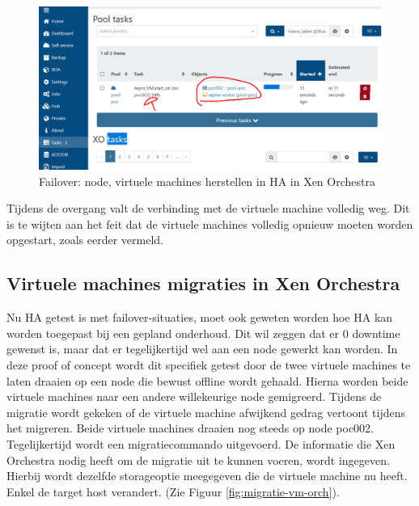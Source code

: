 \begin{figure}[H]
  \centering
  \includegraphics[width=1.1\textwidth, trim=0cm 0cm 5cm 0cm, clip]{../poc/failure-orch.png}
  \caption{Failover: node, virtuele machines herstellen in HA in Xen Orchestra}
  \label{fig:failure-orch}    
\end{figure}
Tijdens de overgang valt de verbinding met de virtuele machine volledig weg. Dit is te wijten aan het feit dat de virtuele machines volledig opnieuw moeten worden opgestart, zoals eerder vermeld.

\subsection{Virtuele machines migraties in Xen Orchestra}%
Nu HA getest is met failover-situaties, moet ook geweten worden hoe HA kan worden toegepast bij een gepland onderhoud. Dit wil zeggen dat er 0 downtime gewenst is, maar dat er tegelijkertijd wel aan een node gewerkt kan worden.
In deze proof of concept wordt dit specifiek getest door de twee virtuele machines te laten draaien op een node die bewust offline wordt gehaald.
Hierna worden beide virtuele machines naar een andere willekeurige node gemigreerd. Tijdens de migratie wordt gekeken of de virtuele machine afwijkend gedrag vertoont tijdens het migreren.
Beide virtuele machines draaien nog steeds op node poc002. Tegelijkertijd wordt een migratiecommando uitgevoerd.
De informatie die Xen Orchestra nodig heeft om de migratie uit te kunnen voeren, wordt ingegeven. Hierbij wordt dezelfde storageoptie meegegeven die de virtuele machine nu heeft. Enkel de target host verandert. (Zie Figuur \ref{fig:migratie-vm-orch}).

